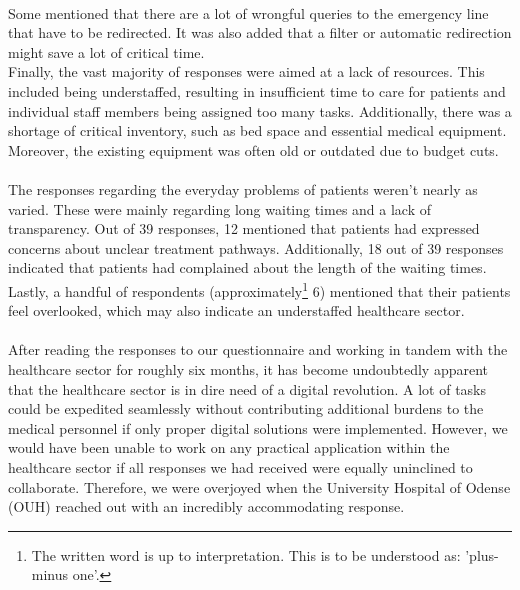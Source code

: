 \\
Some mentioned that there are a lot of wrongful queries to the emergency line that have to be redirected. It was also added that a filter or automatic redirection might save a lot of critical time.
\\
Finally, the vast majority of responses were aimed at a lack of resources. This included being understaffed, resulting in insufficient time to care for patients and individual staff members being assigned too many tasks. Additionally, there was a shortage of critical inventory, such as bed space and essential medical equipment. Moreover, the existing equipment was often old or outdated due to budget cuts.
\\
\\
The responses regarding the everyday problems of patients weren't nearly as varied. These were mainly regarding long waiting times and a lack of transparency. Out of 39 responses, 12 mentioned that patients had expressed concerns about unclear treatment pathways. Additionally, 18 out of 39 responses indicated that patients had complained about the length of the waiting times. Lastly, a handful of respondents (approximately\footnote{The written word is up to interpretation. This is to be understood as: 'plus-minus one'.} 6) mentioned that their patients feel overlooked, which may also indicate an understaffed healthcare sector.
\\
\\
After reading the responses to our questionnaire and working in tandem with the healthcare sector for roughly six months, it has become undoubtedly apparent that the healthcare sector is in dire need of a digital revolution. A lot of tasks could be expedited seamlessly without contributing additional burdens to the medical personnel if only proper digital solutions were implemented. However, we would have been unable to work on any practical application within the healthcare sector if all responses we had received were equally uninclined to collaborate. Therefore, we were overjoyed when the University Hospital of Odense (OUH) reached out with an incredibly accommodating response.

